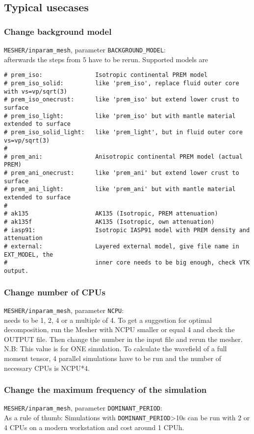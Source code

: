 \documentclass[11pt,letter,fleqn,english,notitlepage]{article}
\begin{document}
\subsection{Typical usecases}
\subsubsection{Change background model}
\verb|MESHER/inparam_mesh|, parameter \verb|BACKGROUND_MODEL|:\\
afterwards the steps from 5 have to be rerun. Supported models are
\begin{verbatim}
# prem_iso:               Isotropic continental PREM model
# prem_iso_solid:         like 'prem_iso', replace fluid outer core with vs=vp/sqrt(3)
# prem_iso_onecrust:      like 'prem_iso' but extend lower crust to surface
# prem_iso_light:         like 'prem_iso' but with mantle material extended to surface
# prem_iso_solid_light:   like 'prem_light', but in fluid outer core vs=vp/sqrt(3)
#
# prem_ani:               Anisotropic continental PREM model (actual PREM)
# prem_ani_onecrust:      like 'prem_ani' but extend lower crust to surface
# prem_ani_light:         like 'prem_ani' but with mantle material extended to surface
# 
# ak135                   AK135 (Isotropic, PREM attenuation)
# ak135f                  AK135 (Isotropic, own attenuation)
# iasp91:                 Isotropic IASP91 model with PREM density and attenuation
# external:               Layered external model, give file name in EXT_MODEL, the 
#                         inner core needs to be big enough, check VTK output.
\end{verbatim} 
\subsubsection{Change number of CPUs}
\verb|MESHER/inparam_mesh|, parameter \verb|NCPU|: \\
needs to be 1, 2, 4 or a multiple of 4. To get a suggestion for optimal decomposition, run the Mesher with NCPU smaller or equal 4 and check the OUTPUT file. Then change the number in the input file and rerun the mesher.\\
N.B: This value is for ONE simulation. To calculate the wavefield of a full moment tensor, 4 parallel simulations have to be run and the number of necessary CPUs is NCPU*4. 
\subsubsection{Change the maximum frequency of the simulation}
\verb|MESHER/inparam_mesh|, parameter \verb|DOMINANT_PERIOD|: \\
As a rule of thumb: Simulations with \verb|DOMINANT_PERIOD|>10s can be run with 2 or 4 CPUs on a modern workstation and cost around 1 CPUh.
\end{document}

